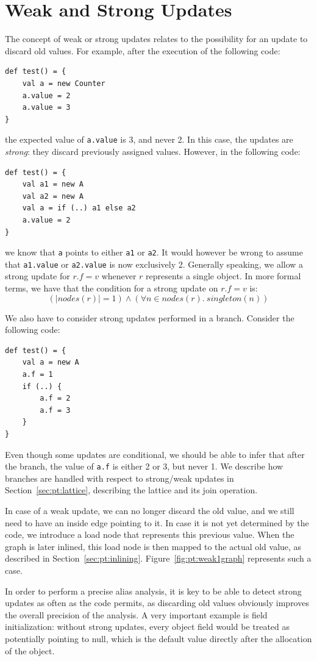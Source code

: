 \section{Weak and Strong Updates}
The concept of weak or strong updates relates to the possibility for an update to
discard old values. For example, after the execution of the following code:
\begin{lstlisting}
def test() = {
    val a = new Counter
    a.value = 2
    a.value = 3
}
\end{lstlisting}
the expected value of \verb/a.value/ is 3, and never 2. In this case, the
updates are \emph{strong}: they discard previously assigned values. However, in
the following code:
\begin{lstlisting}
def test() = {
    val a1 = new A
    val a2 = new A
    val a = if (..) a1 else a2
    a.value = 2
}
\end{lstlisting}
we know that \verb/a/ points to either \verb/a1/ or \verb/a2/. It would however
be wrong to assume that \verb/a1.value/ or \verb/a2.value/ is now exclusively
2. Generally speaking, we allow a strong update for $r.f = v$ whenever $r$
represents a single object. In more formal terms, we have that the condition
for a strong update on $r.f = v$ is:
$$
    (|nodes(r)| = 1) \land ( \forall n \in nodes(r).~singleton(n) )
$$

We also have to consider strong updates performed in a branch. Consider the
following code:

\begin{lstlisting}
def test() = {
    val a = new A
    a.f = 1
    if (..) {
        a.f = 2
        a.f = 3
    }
}
\end{lstlisting}

Even though some updates are conditional, we should be able to infer that
after the branch, the value of \verb/a.f/ is either 2 or 3, but never 1. We
describe how branches are handled with respect to strong/weak updates in
Section~\ref{sec:pt:lattice}, describing the lattice and its join operation.

In case of a weak update, we can no longer discard the old value, and we
still need to have an inside edge pointing to it. In case it is not yet
determined by the code, we introduce a load node that represents this
previous value. When the graph is later inlined, this load node is then mapped to the actual
old value, as described in Section~\ref{sec:pt:inlining}.
Figure~\ref{fig:pt:weak1graph} represents such a case.

In order to perform a precise alias analysis, it is key to be able to detect
strong updates as often as the code permits, as discarding old values obviously
improves the overall precision of the analysis. A very important example is
field initialization:  without strong updates, every object field would
be treated as potentially pointing to null, which is the default value 
directly after the allocation of the object.

